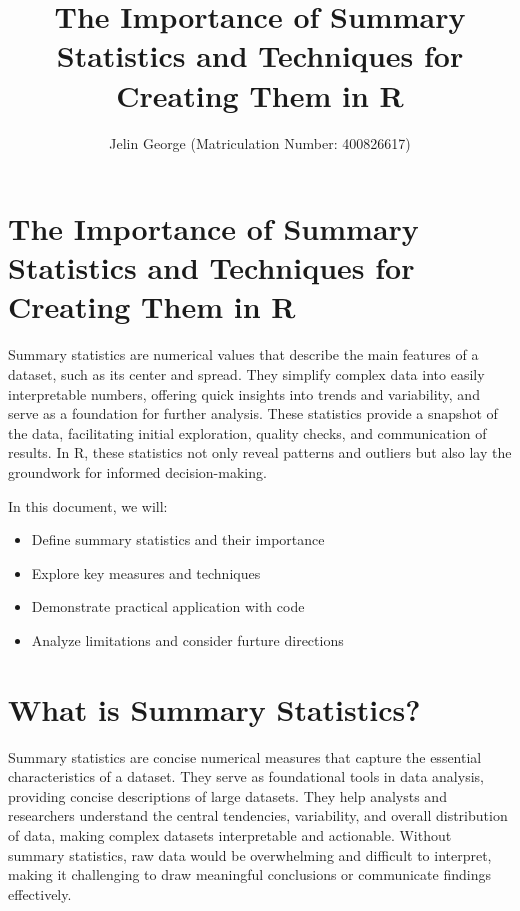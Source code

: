 \documentclass[
  man,
  floatsintext,
  longtable,
  nolmodern,
  notxfonts,
  notimes,
  colorlinks=true,linkcolor=blue,citecolor=blue,urlcolor=blue]{apa7}
\title{The Importance of Summary Statistics and Techniques for Creating
Them in R}
\author{Jelin George (Matriculation Number: 400826617)}
\affiliation{
{Hochschule Fresenius - University of Applied Science}}
\begin{document}
\maketitle

\hypertarget{toc}{}
\tableofcontents
\newpage
\section[Introduction]{The Importance of Summary Statistics and
Techniques for Creating Them in R}

\setcounter{secnumdepth}{-\maxdimen} %

\setlength\LTleft{0pt}


Summary statistics are numerical values that describe the main features
of a dataset, such as its center and spread. They simplify complex data
into easily interpretable numbers, offering quick insights into trends
and variability, and serve as a foundation for further analysis. These
statistics provide a snapshot of the data, facilitating initial
exploration, quality checks, and communication of results. In R, these
statistics not only reveal patterns and outliers but also lay the
groundwork for informed decision-making.

In this document, we will:

\begin{itemize}
\item
  Define summary statistics and their importance
\item
  Explore key measures and techniques
\item
  Demonstrate practical application with code
\item
  Analyze limitations and consider furture directions
\end{itemize}

\section{What is Summary Statistics?}\label{what-is-summary-statistics}

Summary statistics are concise numerical measures that capture the
essential characteristics of a dataset. They serve as foundational tools
in data analysis, providing concise descriptions of large datasets. They
help analysts and researchers understand the central tendencies,
variability, and overall distribution of data, making complex datasets
interpretable and actionable. Without summary statistics, raw data would
be overwhelming and difficult to interpret, making it challenging to
draw meaningful conclusions or communicate findings effectively.
\end{document}
